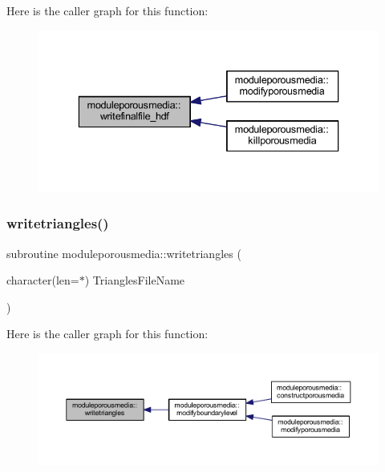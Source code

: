 Here is the caller graph for this function\+:\nopagebreak
\begin{figure}[H]
\begin{center}
\leavevmode
\includegraphics[width=336pt]{namespacemoduleporousmedia_aa65138badcf5c2f27aad4149d87bcd10_icgraph}
\end{center}
\end{figure}
\mbox{\label{namespacemoduleporousmedia_a9df397532d5ac8a58a2087f07677d385}} 
\subsubsection{\texorpdfstring{writetriangles()}{writetriangles()}}
{\footnotesize\ttfamily subroutine moduleporousmedia\+::writetriangles (\begin{DoxyParamCaption}\item[{character(len=$\ast$)}]{Triangles\+File\+Name }\end{DoxyParamCaption})\hspace{0.3cm}{\ttfamily [private]}}

Here is the caller graph for this function\+:\nopagebreak
\begin{figure}[H]
\begin{center}
\leavevmode
\includegraphics[width=350pt]{namespacemoduleporousmedia_a9df397532d5ac8a58a2087f07677d385_icgraph}
\end{center}
\end{figure}


